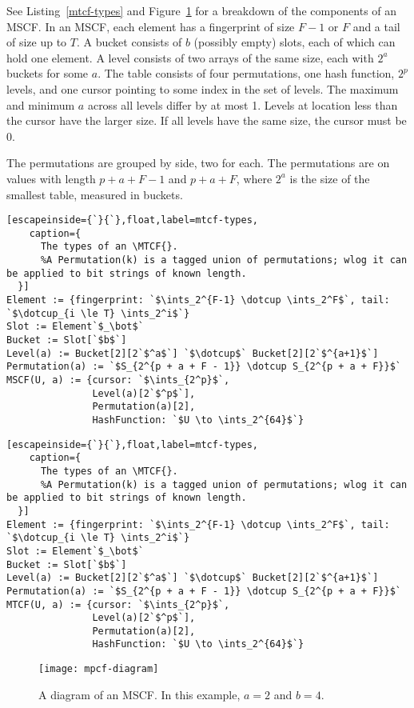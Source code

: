 \documentclass[letterpaper,twocolumn,10pt]{article}
\newcommand{\ints}{\mathbb{Z}}
\newcommand{\dotcup}{\ensuremath{\mathaccent\cdot\cup}}
\newcommand{\MTCF}{MSCF}
\newcommand{\MTCF}{MTCF}
\begin{document}
See Listing~\ref{mtcf-types} and Figure~\ref{mtcf-diagram} for a breakdown of the components of an \MTCF{}.
In an \MTCF{}, each element has a fingerprint of size $F-1$ or $F$ and a tail of size up to $T$.
A bucket consists of $b$ (possibly empty) slots, each of which can hold one element.
A level consists of two arrays of the same size, each with $2^a$ buckets for some $a$.
The table consists of four permutations, one hash function, $2^p$ levels, and one cursor pointing to some index in the set of levels.
The maximum and minimum $a$ across all levels differ by at most 1.
Levels at location less than the cursor have the larger size.
If all levels have the same size, the cursor must be 0.

The permutations are grouped by side, two for each.
The permutations are on values with length $p + a + F - 1$ and $p + a + F$, where $2^a$ is the size of the smallest table, measured in buckets.

\ifanon
\begin{lstlisting}[escapeinside={`}{`},float,label=mtcf-types,
    caption={
      The types of an \MTCF{}.
      %A Permutation(k) is a tagged union of permutations; wlog it can be applied to bit strings of known length.
  }]
Element := {fingerprint: `$\ints_2^{F-1} \dotcup \ints_2^F$`, tail: `$\dotcup_{i \le T} \ints_2^i$`}
Slot := Element`$_\bot$`
Bucket := Slot[`$b$`]
Level(a) := Bucket[2][2`$^a$`] `$\dotcup$` Bucket[2][2`$^{a+1}$`]
Permutation(a) := `$S_{2^{p + a + F - 1}} \dotcup S_{2^{p + a + F}}$`
MSCF(U, a) := {cursor: `$\ints_{2^p}$`,
               Level(a)[2`$^p$`],
               Permutation(a)[2],
               HashFunction: `$U \to \ints_2^{64}$`}
\end{lstlisting}
\else
\begin{lstlisting}[escapeinside={`}{`},float,label=mtcf-types,
    caption={
      The types of an \MTCF{}.
      %A Permutation(k) is a tagged union of permutations; wlog it can be applied to bit strings of known length.
  }]
Element := {fingerprint: `$\ints_2^{F-1} \dotcup \ints_2^F$`, tail: `$\dotcup_{i \le T} \ints_2^i$`}
Slot := Element`$_\bot$`
Bucket := Slot[`$b$`]
Level(a) := Bucket[2][2`$^a$`] `$\dotcup$` Bucket[2][2`$^{a+1}$`]
Permutation(a) := `$S_{2^{p + a + F - 1}} \dotcup S_{2^{p + a + F}}$`
MTCF(U, a) := {cursor: `$\ints_{2^p}$`,
               Level(a)[2`$^p$`],
               Permutation(a)[2],
               HashFunction: `$U \to \ints_2^{64}$`}
\end{lstlisting}
\fi

\begin{figure}[b!]
  \texttt{[image: mpcf-diagram]}
\caption{\label{mtcf-diagram}
A diagram of an \MTCF{}.
In this example, $a = 2$ and $b=4$.
}
\end{figure}
\end{document}

